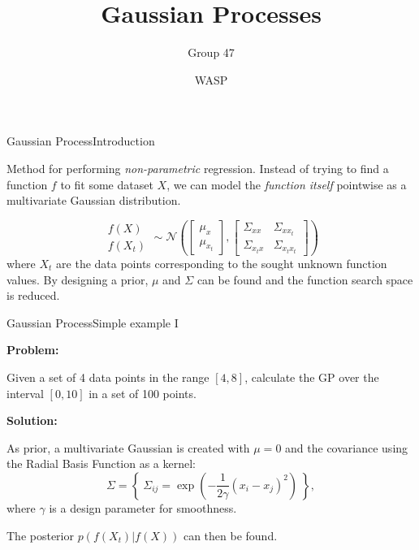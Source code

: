 \documentclass{beamer}
\title{Gaussian Processes}
\date{WASP}
\author[Agents 47]{Group 47}
\begin{document}
\begin{frame}
  \titlepage
\end{frame}


\begin{frame}{Gaussian Process}{Introduction}

Method for performing \emph{non-parametric} regression. Instead of trying to find a function $f$ to fit some dataset $X$, we can model the \emph{function itself} pointwise as a multivariate Gaussian distribution.

\begin{equation}
\begin{matrix}
	f(X) \\
	f(X_t)
\end{matrix} \sim
\mathcal{N} \left(
	\begin{bmatrix}
		\mu_x \\
		\mu_{x_t}
	\end{bmatrix}, 
	\begin{bmatrix}
		\Sigma_{xx} & \Sigma_{xx_t} \\
		\Sigma_{x_tx} & \Sigma_{x_tx_t}
	\end{bmatrix}
\right)
\end{equation}
where $X_t$ are the data points corresponding to the sought unknown function values. By designing a prior, $\mu$ and $\Sigma$ can be found and the function search space is reduced.  


\end{frame}

\begin{frame}{Gaussian Process}{Simple example I}
	
	\textbf{Problem:}
	
		Given a set of 4 data points in the range $[4, 8]$, calculate the GP over the interval $[0, 10]$ in a set of 100 points. 
		
	\textbf{Solution:}

	As prior, a multivariate Gaussian is created with $\mu = 0$ and the covariance using the Radial Basis Function as a kernel:
	\begin{equation}
		\Sigma = \left\{~\Sigma_{ij} = \exp \left( -\frac{1}{2\gamma} (x_i- x_j)^2 \right) ~ \right\},
	\end{equation}
	where $\gamma$ is a design parameter for smoothness. 
	
	The posterior $p \left( f(X_t) | f(X) \right) $ can then be found. 

\end{frame}
\end{document}
